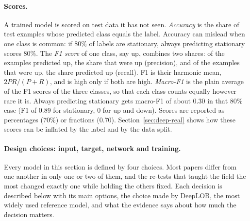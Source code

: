 \paragraph{Scores.} A trained model is scored on test data it has not seen. \emph{Accuracy} is the share of test
examples whose predicted class equals the label. Accuracy can mislead when one class is common: if 80\% of labels
are stationary, always predicting stationary scores 80\%. The \emph{F1 score} of one class, say up, combines two
shares: of the examples predicted up, the share that were up (precision), and of the examples that were up, the
share predicted up (recall). F1 is their harmonic mean, $2PR/(P+R)$, and is high only if both are high.
\emph{Macro-F1} is the plain average of the F1 scores of the three classes, so that each class counts equally
however rare it is. Always predicting stationary gets macro-F1 of about 0.30 in that 80\% case (F1 of 0.89 for
stationary, 0 for up and down). Scores are reported as percentages (70\%) or fractions (0.70). Section~\ref{sec:deep-real}
shows how these scores can be inflated by the label and by the data split.

\paragraph{Design choices: input, target, network and training.} Every model in this section is defined by four
choices. Most papers differ from one another in only one or two of them, and the re-tests that taught the field
the most changed exactly one while holding the others fixed. Each decision is described below with its main options,
the choice made by DeepLOB, the most widely used reference model, and what the evidence says about how much the
decision matters.

